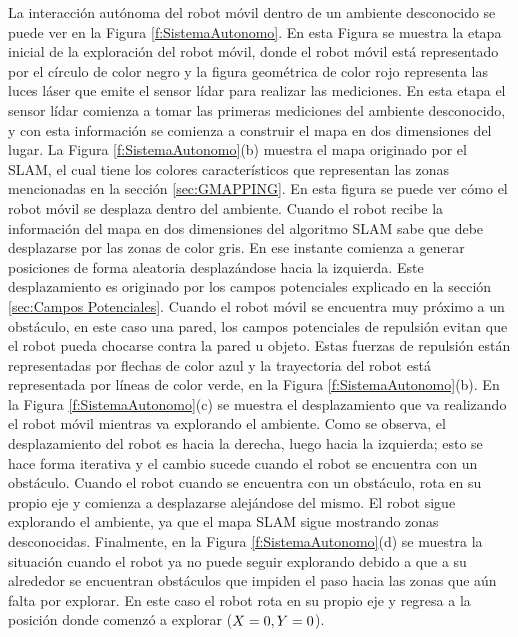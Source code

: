 La interacción autónoma del robot móvil dentro de un ambiente desconocido se puede ver en la 
Figura \ref{f:SistemaAutonomo}. En esta Figura se muestra la etapa inicial de la exploración 
del robot móvil, donde el robot móvil está representado por el círculo de color negro y la 
figura geométrica de color rojo representa las luces láser que emite el sensor lídar para 
realizar las mediciones. En esta etapa el sensor lídar comienza a tomar las primeras mediciones 
del ambiente desconocido, y con esta información se comienza a construir el mapa en dos 
dimensiones del lugar. La Figura \ref{f:SistemaAutonomo}(b) muestra el mapa originado por 
el SLAM, el cual tiene los colores característicos que representan las zonas mencionadas en 
la sección \ref{sec:GMAPPING}. En esta figura se puede ver cómo el robot móvil se desplaza 
dentro del ambiente. Cuando el robot recibe la información del mapa en dos 
dimensiones del algoritmo SLAM sabe que debe desplazarse por las zonas de color gris. En ese 
instante comienza a generar posiciones de forma aleatoria desplazándose hacia la izquierda. Este 
desplazamiento es originado por los campos potenciales explicado en la sección 
\ref{sec:Campos Potenciales}. Cuando el robot móvil se encuentra muy próximo a un obstáculo, en 
este caso una pared, los campos potenciales de repulsión evitan que el robot pueda chocarse contra
la pared u objeto. Estas fuerzas de repulsión están representadas por flechas de color azul y la 
trayectoria del robot está representada por líneas de color verde, en la Figura 
\ref{f:SistemaAutonomo}(b). En la Figura \ref{f:SistemaAutonomo}(c) se muestra el desplazamiento 
que va realizando el robot móvil mientras va explorando el ambiente. Como se observa, el 
desplazamiento del robot es hacia la derecha, luego hacia la izquierda; esto se hace forma iterativa
y el cambio sucede cuando el robot se encuentra con un obstáculo. Cuando el robot cuando se encuentra 
con un obstáculo, rota en su propio eje y comienza a desplazarse alejándose del mismo. El robot 
sigue explorando el ambiente, ya que el mapa SLAM sigue mostrando zonas desconocidas. Finalmente, 
en la Figura \ref{f:SistemaAutonomo}(d) se muestra la situación cuando el robot ya no puede seguir 
explorando debido a que a su alrededor se encuentran obstáculos que impiden el paso hacia las zonas
que aún falta por explorar. En este caso el robot rota en su propio eje y regresa a la posición 
donde comenzó a explorar ($\mathnormal X=0,\mathnormal Y=0$).

